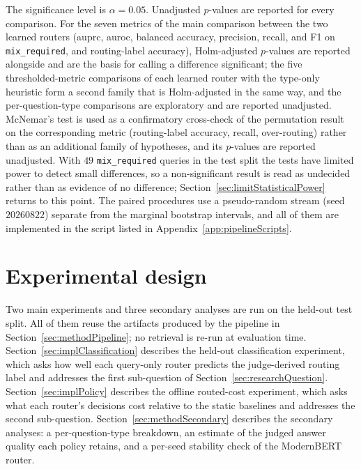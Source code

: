 \documentclass[english, bibtex]{kththesis}               %
\numberwithin{listing}{chapter}
\begin{document}
The significance level is $\alpha = 0.05$. Unadjusted $p$-values are reported for every comparison. For the seven metrics of the main comparison between the two learned routers (\gls{auprc}, \gls{auroc}, balanced accuracy, precision, recall, and F1 on \texttt{mix\_required}, and routing-label accuracy), Holm-adjusted $p$-values \cite{holm1979} are reported alongside and are the basis for calling a difference significant; the five thresholded-metric comparisons of each learned router with the type-only heuristic form a second family that is Holm-adjusted in the same way, and the per-question-type comparisons are exploratory and are reported unadjusted. McNemar's test is used as a confirmatory cross-check of the permutation result on the corresponding metric (routing-label accuracy, recall, over-routing) rather than as an additional family of hypotheses, and its $p$-values are reported unadjusted. With $49$ \texttt{mix\_required} queries in the test split the tests have limited power to detect small differences, so a non-significant result is read as undecided rather than as evidence of no difference; Section~\ref{sec:limitStatisticalPower} returns to this point. The paired procedures use a pseudo-random stream (seed $20260822$) separate from the marginal bootstrap intervals, and all of them are implemented in the script listed in Appendix~\ref{app:pipelineScripts}.

\section{Experimental design}
\label{sec:methodExperiments}

Two main experiments and three secondary analyses are run on the held-out test split. All of them reuse the artifacts produced by the pipeline in Section~\ref{sec:methodPipeline}; no retrieval is re-run at evaluation time. Section~\ref{sec:implClassification} describes the held-out classification experiment, which asks how well each query-only router predicts the judge-derived routing label and addresses the first sub-question of Section~\ref{sec:researchQuestion}. Section~\ref{sec:implPolicy} describes the offline routed-cost experiment, which asks what each router's decisions cost relative to the static baselines and addresses the second sub-question. Section~\ref{sec:methodSecondary} describes the secondary analyses: a per-question-type breakdown, an estimate of the judged answer quality each policy retains, and a per-seed stability check of the ModernBERT router.
\end{document}
